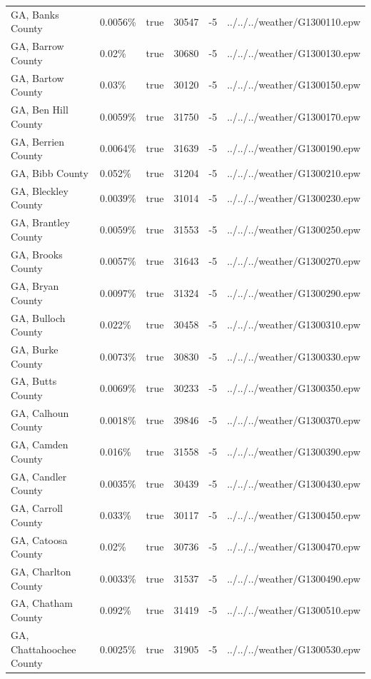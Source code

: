 \begin{longtable}[]{@{}llllll@{}}
GA, Banks County & 0.0056\% & true & 30547 & -5 &
../../../weather/G1300110.epw \\
GA, Barrow County & 0.02\% & true & 30680 & -5 &
../../../weather/G1300130.epw \\
GA, Bartow County & 0.03\% & true & 30120 & -5 &
../../../weather/G1300150.epw \\
GA, Ben Hill County & 0.0059\% & true & 31750 & -5 &
../../../weather/G1300170.epw \\
GA, Berrien County & 0.0064\% & true & 31639 & -5 &
../../../weather/G1300190.epw \\
GA, Bibb County & 0.052\% & true & 31204 & -5 &
../../../weather/G1300210.epw \\
GA, Bleckley County & 0.0039\% & true & 31014 & -5 &
../../../weather/G1300230.epw \\
GA, Brantley County & 0.0059\% & true & 31553 & -5 &
../../../weather/G1300250.epw \\
GA, Brooks County & 0.0057\% & true & 31643 & -5 &
../../../weather/G1300270.epw \\
GA, Bryan County & 0.0097\% & true & 31324 & -5 &
../../../weather/G1300290.epw \\
GA, Bulloch County & 0.022\% & true & 30458 & -5 &
../../../weather/G1300310.epw \\
GA, Burke County & 0.0073\% & true & 30830 & -5 &
../../../weather/G1300330.epw \\
GA, Butts County & 0.0069\% & true & 30233 & -5 &
../../../weather/G1300350.epw \\
GA, Calhoun County & 0.0018\% & true & 39846 & -5 &
../../../weather/G1300370.epw \\
GA, Camden County & 0.016\% & true & 31558 & -5 &
../../../weather/G1300390.epw \\
GA, Candler County & 0.0035\% & true & 30439 & -5 &
../../../weather/G1300430.epw \\
GA, Carroll County & 0.033\% & true & 30117 & -5 &
../../../weather/G1300450.epw \\
GA, Catoosa County & 0.02\% & true & 30736 & -5 &
../../../weather/G1300470.epw \\
GA, Charlton County & 0.0033\% & true & 31537 & -5 &
../../../weather/G1300490.epw \\
GA, Chatham County & 0.092\% & true & 31419 & -5 &
../../../weather/G1300510.epw \\
GA, Chattahoochee County & 0.0025\% & true & 31905 & -5 &
../../../weather/G1300530.epw \\

\end{longtable}
